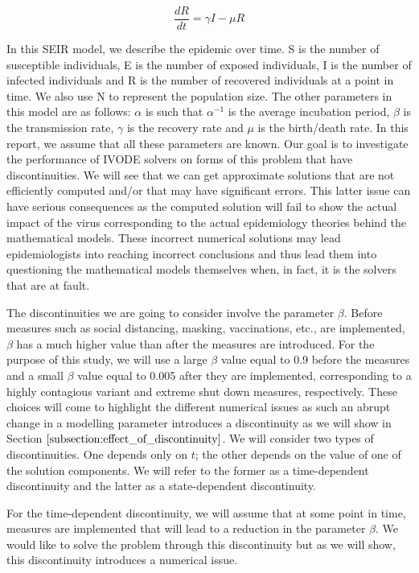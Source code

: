 \begin{equation}
\frac{\textit{d}R}{\textit{dt}} = \gamma I - \mu R \nonumber
\end{equation} 

In this SEIR model, we describe the epidemic over time. S is the number of susceptible individuals, E is the number of exposed individuals, I is the number of infected individuals and R is the number of recovered individuals at a point in time. We also use N to represent the population size.
The other parameters in this model are as follows: $\alpha$ is such that $\alpha^{-1}$ is the average incubation period, $\beta$ is the transmission rate, $\gamma$ is the recovery rate and $\mu$ is the birth/death rate. In this report, we assume that all these parameters are known. Our goal is to investigate the performance of IVODE solvers on forms of this problem that have discontinuities. We will see that we can get approximate solutions that are not efficiently computed and/or that may have significant errors. This latter issue can have serious consequences as the computed solution will fail to show the actual impact of the virus corresponding to the actual epidemiology theories behind the mathematical models. These incorrect numerical solutions may lead epidemiologists into reaching incorrect conclusions and thus lead them into questioning the mathematical models themselves when, in fact, it is the solvers that are at fault.

The discontinuities we are going to consider involve the parameter $\beta$.
Before measures such as social distancing, masking, vaccinations, etc., are implemented, $\beta$ has a much higher value than after the measures are introduced. For the purpose of this study, we will use a large $\beta$ value equal to 0.9 before the measures and a small $\beta$ value equal to 0.005 after they are implemented, corresponding to a highly contagious variant and extreme shut down measures, respectively. These choices will come to highlight the different numerical issues as such an abrupt change in a modelling parameter introduces a discontinuity as we will show in Section $\ref{subsection:effect_of_discontinuity}$. We will consider two types of discontinuities. One depends only on $t$; the other depends on the value of one of the solution components. We will refer to the former as a time-dependent discontinuity and the latter as a state-dependent discontinuity.

For the time-dependent discontinuity, we will assume that at some point in time, measures are implemented that will lead to a reduction in the parameter $\beta$. We would like to solve the problem through this discontinuity but as we will show, this discontinuity introduces a numerical issue.

